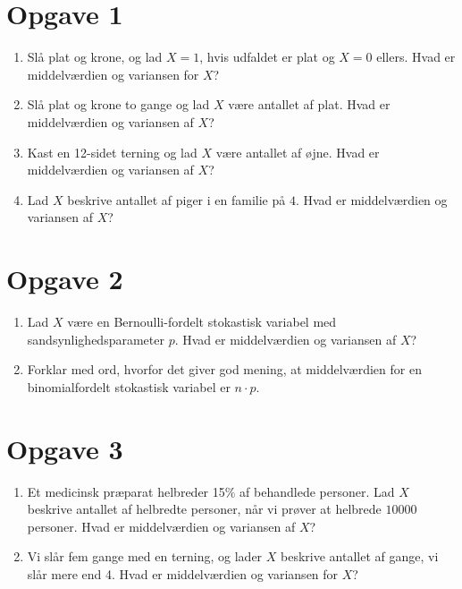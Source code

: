 \section*{Opgave 1}
\begin{enumerate}[label=\roman*)]
\item Slå plat og krone, og lad $X=1$, hvis udfaldet er plat og $X=0$ ellers. Hvad er middelværdien og variansen for $X$?
\item Slå plat og krone to gange og lad $X$ være antallet af plat. Hvad er middelværdien og variansen af $X$?
\item Kast en 12-sidet terning og lad $X$ være antallet af øjne. Hvad er middelværdien og variansen af $X$?
\item Lad $X$ beskrive antallet af piger i en familie på $4$. Hvad er middelværdien og variansen af $X$?
\end{enumerate}

\section*{Opgave 2}
\begin{enumerate}[label=\roman*)]
\item Lad $X$ være en Bernoulli-fordelt stokastisk variabel med sandsynlighedsparameter $p$. Hvad er middelværdien og variansen af $X$?
\item Forklar med ord, hvorfor det giver god mening, at middelværdien for en binomialfordelt stokastisk variabel er $n\cdot p$. 
\end{enumerate}

\section*{Opgave 3}
\begin{enumerate}[label=\roman*)]
\item Et medicinsk præparat helbreder 15$\%$ af behandlede personer. Lad $X$ beskrive antallet af helbredte personer, når vi prøver at helbrede $10000$ personer. Hvad er middelværdien og variansen af $X$?
\item Vi slår fem gange med en terning, og lader $X$ beskrive antallet af gange, vi slår mere end 4. Hvad er middelværdien og variansen for $X$?
\end{enumerate}